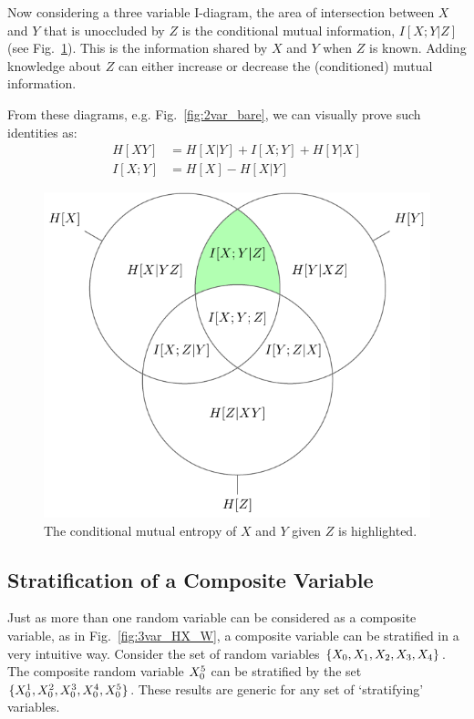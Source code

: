 Now considering a three variable I-diagram, the area of intersection between $X$ and $Y$ that is unoccluded by $Z$ is the conditional mutual information, $I[X;Y|Z]$ (see Fig.~\ref{fig:3var_IXY_Z}). This is the information shared by $X$ and $Y$ when $Z$ is known. Adding knowledge about $Z$ can either increase or decrease the (conditioned) mutual information.

From these diagrams, e.g. Fig.~\ref{fig:2var_bare}, we can visually prove such identities as:
\begin{align*}
H[X Y] &= H[X|Y] + I[X;Y] + H[Y|X]\\
I[X;Y] &= H[X] - H[X|Y]
\end{align*}

\begin{figure}[h]
\centering
\includegraphics{../appendix2/figures/tikz/3var/3var_IXY_Z}
\caption{The conditional mutual entropy of $X$ and $Y$ given $Z$ is highlighted.}
\label{fig:3var_IXY_Z}
\end{figure}

\subsection{Stratification of a Composite Variable}
Just as more than one random variable can be considered as a composite variable, as in Fig.~\ref{fig:3var_HX_W}, a composite variable can be stratified in a very intuitive way. Consider the set of random variables $\{{X}_0, {X}_1, {X}_2, {X}_3, {X}_4\}$. The composite random variable ${X}_0^5$ can be stratified by the set $\{{X}_{0}^{1}, {X}_{0}^{2}, {X}_{0}^{3}, {X}_{0}^{4}, {X}_{0}^{5}\}$. These results are generic for any set of `stratifying' variables.


